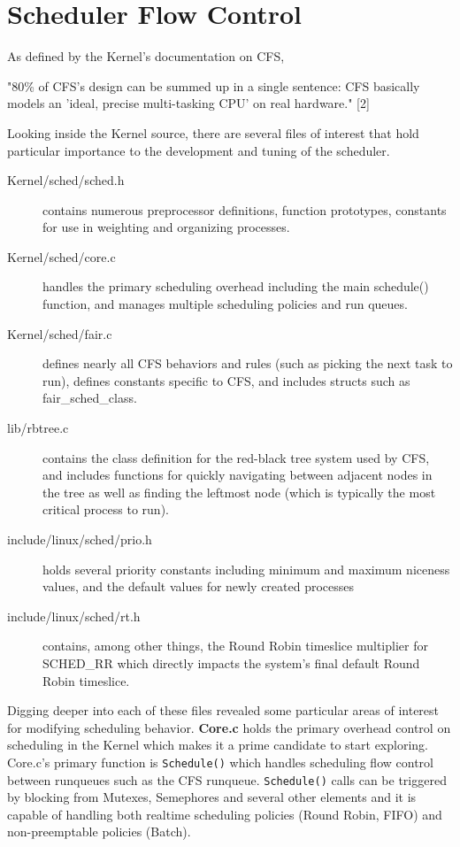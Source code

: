\section{Scheduler Flow Control}

As defined by the Kernel's documentation on CFS,

"80\% of CFS's design can be summed up in a single sentence: CFS basically models an 'ideal, precise multi-tasking CPU' on real hardware." [2]
\vspace{1pc}

Looking inside the Kernel source, there are several files of interest that hold particular importance to the development and tuning of the scheduler.

\begin{description}
	\item[Kernel/sched/sched.h] contains numerous preprocessor definitions, function prototypes, constants for use in weighting and organizing processes.
	\item[Kernel/sched/core.c] handles the primary scheduling overhead including the main schedule() function, and manages multiple scheduling policies and run queues.
	\item[Kernel/sched/fair.c] defines nearly all CFS behaviors and rules (such as picking the next task to run), defines constants specific to CFS, and includes structs such as fair\_sched\_class.
	\item[lib/rbtree.c] contains the class definition for the red-black tree system used by CFS, and includes functions for quickly navigating between adjacent nodes in the tree as well as finding the leftmost node (which is typically the most critical process to run).
	\item[include/linux/sched/prio.h] holds several priority constants including minimum and maximum niceness values, and the default values for newly created processes
	\item[include/linux/sched/rt.h] contains, among other things, the Round Robin timeslice multiplier for SCHED\_RR which directly impacts the system's final default Round Robin timeslice.
\end{description}

Digging deeper into each of these files revealed some particular areas of interest for modifying scheduling behavior. \textbf{Core.c} holds the primary overhead control on scheduling in the Kernel which makes it a prime candidate to start exploring. Core.c's primary function is \texttt{Schedule()} which handles scheduling flow control between runqueues such as the CFS runqueue. \texttt{Schedule()} calls can be triggered by blocking from Mutexes, Semephores and several other elements and it is capable of handling both realtime scheduling policies (Round Robin, FIFO) and non-preemptable policies (Batch).

